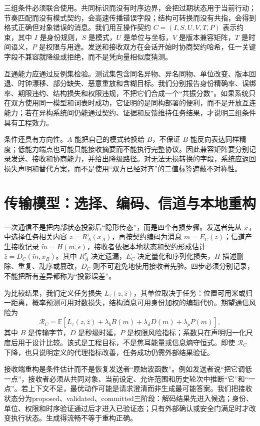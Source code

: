 三组条件必须联合使用。共同标识而没有时序边界，会把过期状态用于当前行动；节奏匹配而没有模式契约，会高速传播错误字段；结构可转换而没有共指，会得到格式正确但对象错误的消息。我们用互操作契约 $C=(I,S,U,V,T,P)$ 表示约束，其中 $I$ 是身份规则，$S$ 是模式，$U$ 是单位与坐标，$V$ 是版本兼容矩阵，$T$ 是时间语义，$P$ 是权限与用途。发送和接收双方在会话开始时协商契约哈希，任一关键字段不兼容就降级或拒绝，而不是凭向量相似度猜测。

互通能力应通过反例集检验。测试集包含同名异物、异名同物、单位改变、版本回退、时钟漂移、部分缺失、恶意重放和含糊目标。我们分别报告身份精确率、误绑率、期限违约、结构损失和权限违规，不把它们合成一个“共振分数”。如果系统只在双方使用同一模型和词表时成功，它证明的是同构部署的便利，而不是开放互连能力；若在异构系统间仍能通过契约、证据和反馈维持任务结果，才说明三组条件具有工程效力。

条件还具有方向性。$A$ 能把自己的模式转换给 $B$，不保证 $B$ 能反向表达同样精度；低能力端点也可能只能接收摘要而不能执行完整协议。因此兼容矩阵要分别记录发送、接收和协商能力，并给出降级路径。对无法无损转换的字段，系统应返回损失声明和替代方案，而不是使用“双方已经对齐”的二值标签遮蔽不对称性。

\section{传输模型：选择、编码、信道与本地重构}
\label{sec:comm_physics_model}

一次通信不是把内部状态投影后“隐形传态”，而是四个有损步骤。发送者先从 $x_A$ 中选择任务相关内容 $z=R_A^\tau(x_A)$，再按契约编码为消息 $m=E_C(z)$；信道产生接收记录 $\tilde m=H(m,\epsilon)$，接收者依据本地状态和契约形成估计 $\hat z=D_C(\tilde m,x_B)$。其中 $R_A^\tau$ 决定遗漏，$E_C$ 决定量化和序列化损失，$H$ 描述删除、重复、乱序或篡改，$D_C$ 则不可避免地使用接收者先验。四步必须分别记录，不能把所有差异都称为“投影误差”。

为比较结果，我们定义任务损失 $L_\tau(z,\hat z)$，其单位取决于任务：位置可用米或归一距离，概率预测可用对数损失，结构消息可用身份加权的编辑代价。期望通信风险为
\begin{equation}
 \mathcal R_C=\mathbb E\!\left[L_\tau(z,\hat z)+\lambda_b B(m)+\lambda_d D(m)+\lambda_p P(m)\right],
\end{equation}
其中 $B$ 是传输字节，$D$ 是秒级时延，$P$ 是权限风险指标；系数只在声明归一化尺度后用于设计比较。该式是工程目标，不是焦耳能量或信息熵守恒式。即使 $\mathcal R_C$ 下降，也只说明定义的代理指标改善，任务成功仍需外部结果验证。

接收端重构是条件估计而不是恢复发送者“原始波函数”。例如发送者说“把它调低一点”，接收者必须从共同对象、当前设定、允许范围和历史轮次中推断“它”和“一点”。若上下文不足，最优动作可能是请求澄清而非生成最可能答案。我们把接收状态分为proposed、validated、committed三阶段：解码结果先进入候选；身份、单位、权限和时序验证通过后才进入已验证态；只有外部确认或安全门满足时才改变执行状态。生成得流畅不等于重构正确。

